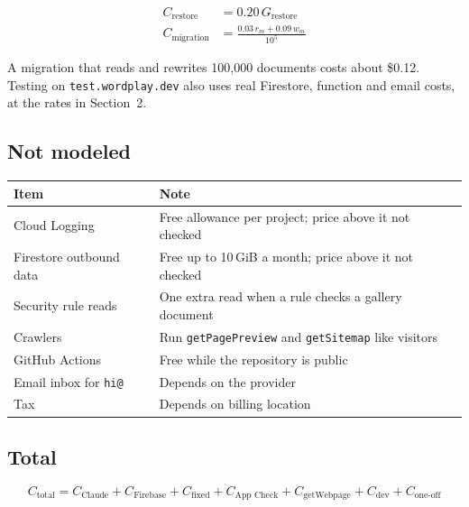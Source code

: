 \documentclass[11pt]{article}
\begin{document}
\begin{align*}
C_{\text{restore}} &= 0.20\,G_{\text{restore}} \\
C_{\text{migration}} &= \frac{0.03\,r_m + 0.09\,w_m}{10^{5}}
\end{align*}

A migration that reads and rewrites 100{,}000 documents costs about \$0.12.
Testing on \texttt{test.wordplay.dev} also uses real Firestore, function and
email costs, at the rates in Section~2.

\subsection{Not modeled}

\begin{center}
\begin{tabular}{ll}
\toprule
Item & Note \\
\midrule
Cloud Logging & Free allowance per project; price above it not checked \\
Firestore outbound data & Free up to 10\,GiB a month; price above it not checked \\
Security rule reads & One extra read when a rule checks a gallery document \\
Crawlers & Run \texttt{getPagePreview} and \texttt{getSitemap} like visitors \\
GitHub Actions & Free while the repository is public \\
Email inbox for \texttt{hi@} & Depends on the provider \\
Tax & Depends on billing location \\
\bottomrule
\end{tabular}
\end{center}

\subsection{Total}

\[
C_{\text{total}} =
C_{\text{Claude}} + C_{\text{Firebase}} + C_{\text{fixed}}
+ C_{\text{App Check}} + C_{\text{getWebpage}} + C_{\text{dev}}
+ C_{\text{one-off}}
\]
\end{document}
